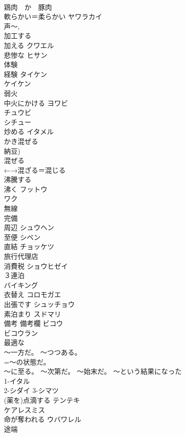 \documentclass[8pt]{extreport}
\begin{document}
\begin{CJK}{UTF8}{min}
\\	鶏肉　か　豚肉	
\\	軟らかい＝柔らかい	ヤワラカイ 
\\	声〜, 
\\	加工する	
\\	加える	クワエル 
\\	悲惨な	ヒサン 
\\	体験 
\\	経験	タイケン 
\\	ケイケン 
\\	弱火 
\\	中火にかける	ヨワビ 
\\	チュウビ 
\\	シチュー	
\\	炒める	イタメル 
\\	かき混ぜる	
\\	納豆) 
\\	混ぜる 
\\	←→混ざる＝混じる 
\\	沸騰する 
\\	沸く	フットウ 
\\	ワク 
\\	無線
\\	完備	
\\	周辺	シュウヘン 
\\	至便	シベン 
\\	直結	チョッケツ 
\\	旅行代理店	
\\	消費税	ショウヒゼイ 
\\	３連泊	
\\	バイキング	
\\	衣替え	コロモガエ 
\\	出張です	シュッチョウ 
\\	素泊まり	スドマリ 
\\	備考 備考欄	ビコウ 
\\	ビコウラン 
\\	最適な	
\\	〜一方だ。 〜つつある。	
\\	=〜の状態だ。
\\	〜に至る。 〜次第だ。 〜始末だ。	〜という結果になった 
\\	1-イタル
\\	2-シダイ 3-シマツ
\\	(薬を)点滴する	テンテキ 
\\	ケアレスミス	
\\	命が奪われる	ウバワレル 
\\	途端	

\end{CJK}
\end{document}
